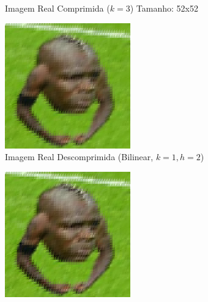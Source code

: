 \documentclass[12pt, a4paper]{article}
\begin{document}
\begin{figure}[H]
\begin{subfigure}[b]{0.45\textwidth}
        \caption{Imagem Real Comprimida ($k=3$) Tamanho: 52x52}
        \label{fig:selva_compressed_k3}
    \end{subfigure}
    
    \vspace{0.5cm}
    
    \begin{subfigure}[b]{0.45\textwidth}
        \centering
        \includegraphics[width=\textwidth]{results/case_6/bilinear_decompressed_k1_h2_step2.png}
        \caption{Imagem Real Descomprimida (Bilinear, $k=1, h=2$)}
        \label{fig:selva_bilinear_k3}
    \end{subfigure}
    \hfill
    \begin{subfigure}[b]{0.45\textwidth}
        \centering
        \includegraphics[width=\textwidth]{results/case_6/bicubic_decompressed_k1_h2_step2.png}

\end{subfigure}
\end{figure}
\end{document}
